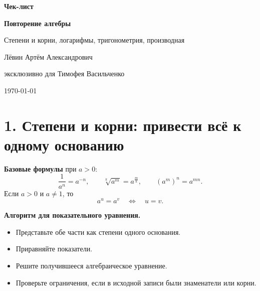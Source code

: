 \documentclass[a4paper,12pt]{article}
\newcommand{\key}[1]{\textcolor{darkaccent}{\textbf{#1}}}
\begin{document}
\begin{titlepage}
\thispagestyle{empty}
\centering
\vspace*{2.8cm}

{\Large\textcolor{darkaccent}{\textbf{Чек-лист}}\par}
\vspace{0.8cm}
{\huge\bfseries Повторение алгебры\par}
\vspace{0.4cm}
{\Large Степени и корни, логарифмы, тригонометрия, производная\par}

\vspace{2.2cm}
{\large Лёвин Артём Александрович\par}
\vspace{0.2cm}
{\large эксклюзивно для Тимофея Васильченко\par}

\vspace{1.2cm}
{\large \today\par}

\vfill
{}
\end{titlepage}

\section{1. Степени и корни: привести всё к одному основанию}

\key{Базовые формулы} при $a>0$:
\[
\frac{1}{a^n}=a^{-n},\qquad
\sqrt[k]{a^m}=a^{\frac{m}{k}},\qquad
(a^m)^n=a^{mn}.
\]
Если $a>0$ и $a\ne1$, то
\[
a^{u}=a^{v}\quad\Longleftrightarrow\quad u=v.
\]

\key{Алгоритм для показательного уравнения.}
\begin{itemize}
  \item Представьте обе части как степени одного основания.
  \item Приравняйте показатели.
  \item Решите получившееся алгебраическое уравнение.
  \item Проверьте ограничения, если в исходной записи были знаменатели или корни.
\end{itemize}
\end{document}
